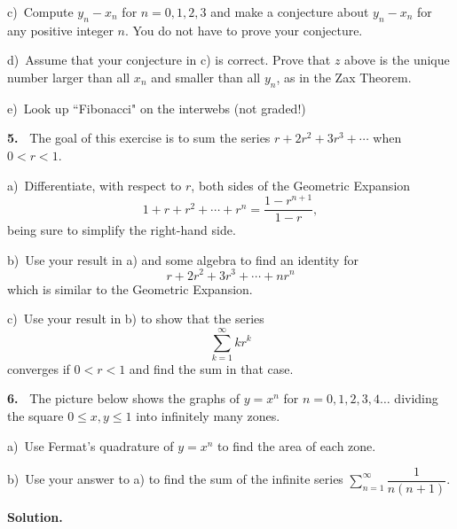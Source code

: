 \documentclass[12pt]{article}
\theoremstyle{definition}
\theoremstyle{remark}
\theoremstyle{definition}
\newenvironment{Solution}{\noindent\textbf{Solution.}}{}
\begin{document}
c)\ Compute $y_n-x_n$ for $n=0,1,2,3$ and make a conjecture about $y_n-x_n$ for any positive integer $n$. You do not have to prove your conjecture.

d)\ Assume that your conjecture in c) is correct. Prove that $z$ above is the unique number larger than all $x_n$ and smaller than all $y_n$, as in the Zax Theorem.

e)\ Look up ``Fibonacci" on the interwebs (not graded!) 



{\bf 5.\ } The goal of this exercise is to sum the series $r+2r^2+3r^3+\cdots$ when $0<r<1$. 

a)\ Differentiate, with respect to $r$, both sides of the Geometric Expansion
\[1+r+r^2+\cdots+r^{n}=\frac{1-r^{n+1}}{1-r},\]
being sure to simplify the right-hand side. 


b)\ Use your result in a) and some algebra to find an identity for 
\[r+2r^2+3r^3+\cdots +n r^n\]
which is similar to the Geometric Expansion. 


c)\ Use your result in b) to show that the series \[\sum_{k=1}^\infty k r^k\]
converges if $0<r<1$ and find the sum in that case. 



 
{\bf 6.\ } The picture below shows the graphs of $y=x^n$ for $n=0,1,2,3,4\dots$ dividing the square $0\leq x,y\leq 1$ into infinitely many zones. 

a)\ Use Fermat's quadrature of $y=x^n$ to find the area of each zone. 

b)\ Use your answer to a) to find the sum of the infinite series
$\sum\limits_{n=1}^\infty\dfrac{1}{n(n+1)}$. 

\begin{center}
\end{center}

\begin{Solution} 
\end{Solution}
\end{document}
